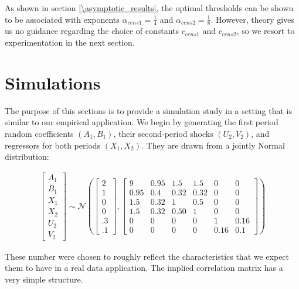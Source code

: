 As shown in section \ref{\asymptotic_results}, the optimal thresholds can be shown to be associated with exponents $\alpha_{cens1} = \frac{1}{4}$ and $\alpha_{cens2} = \frac{1}{8}$. However, theory gives us no guidance regarding the choice of constants $c_{cens1}$ and $c_{cens2}$, so we resort to experimentation in the next section.






\section{Simulations} \label{sec:simulation}

The purpose of this sections is to provide a simulation study in a setting that is similar to our empirical application. We begin by generating the first period random coefficients $(A_1, B_1)$, their second-period shocks $(U_2, V_2)$,
and regressors for both periods $(X_1, X_2)$. They are drawn from a jointly Normal distribution:

\begin{align} \label{eq:simulation_model}
\begin{bmatrix}
  A_1\\
  B_1\\
  X_1\\
  X_2\\
  U_2\\
  V_2 
\end{bmatrix}
\sim
\mathcal{N}\left(
\begin{bmatrix}
2 \\ 
1 \\ 
0 \\ 
0 \\ 
.3 \\
.1 
\end{bmatrix}
,
\begin{bmatrix}
  9 & 0.95 & 1.5 & 1.5 & 0 & 0 \\
  0.95 & 0.4 & 0.32 & 0.32 & 0 & 0 \\
  1.5 & 0.32 & 1 & 0.5 & 0 & 0 \\
  1.5 & 0.32 & 0.50 & 1 & 0 & 0 \\ 
  0 & 0 & 0 & 0 & 1 & 0.16 \\
  0 & 0 & 0 & 0 & 0.16 & 0.1 
\end{bmatrix}
\right)
\end{align}

These number were chosen to roughly reflect the characteristics that we expect them to have in a real data
application. The implied correlation matrix has a very simple structure.

